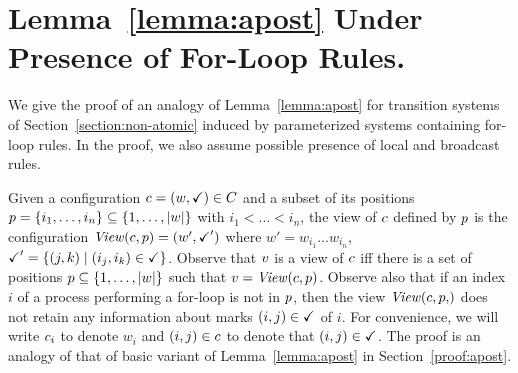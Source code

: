 \section{\bf Lemma~\ref{lemma:apost} Under Presence of For-Loop Rules.}
\label{proof:non-atomic}

We give the proof of an analogy of Lemma~\ref{lemma:apost} 
%
for transition systems of Section~\ref{section:non-atomic} induced by parameterized systems containing for-loop rules.
%
In the proof, we also assume possible presence of local and broadcast rules.

Given a configuration $c = (w,\checkmark)\in C$
%
and a subset of its positions $p = \{i_1,\ldots, i_n\}\subseteq \{1,\ldots, |w|\}$
%
with $i_1<\ldots < i_n$, 
%
the view of $c$ defined by $p$ is the configuration
%
$\mathit{View}(c,p) = (w',\checkmark')$ where 
%
$w' = w_{i_1}\ldots w_{i_n}$, $\checkmark' = \{(j,k)\mid (i_j,i_k)\in\checkmark\}$. 
%
Observe that $v$ is a view of $c$ iff 
%
there is a set of positions $p\subseteq  \{1,\ldots, |w|\}$ 
%
such that $v = \mathit{View}(c,p)$.
%
Observe also that if an index $i$ of a process performing a for-loop is not in $p$, 
%
then the view $\Viewof{\conf,\pos}$ does not retain any information about marks $(i,j)\in\checkmark$ of $i$.
%
For convenience, we will write $c_i$ to denote $w_i$ 
%
and $(i,j)\in c$ to denote that $(i,j) \in \checkmark$.
%
%
The proof is an analogy of that of basic variant of Lemma~\ref{lemma:apost} in Section~\ref{proof:apost}.

